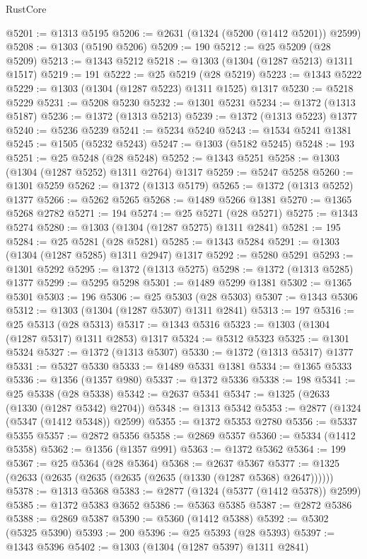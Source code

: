 \begin{lexlean}{RustCore}
\begin{coremodule}
@5201 := @1313 @5195
@5206 := @2631 (@1324 (@5200 (@1412 @5201)) @2599)
@5208 := @1303 (@5190 @5206)
@5209 := 190
@5212 := @25 @5209 (@28 @5209)
@5213 := @1343 @5212
@5218 := @1303 (@1304 (@1287 @5213) @1311 @1517)
@5219 := 191
@5222 := @25 @5219 (@28 @5219)
@5223 := @1343 @5222
@5229 := @1303 (@1304 (@1287 @5223) @1311 @1525) @1317
@5230 := @5218 @5229
@5231 := @5208 @5230
@5232 := @1301 @5231
@5234 := @1372 (@1313 @5187)
@5236 := @1372 (@1313 @5213)
@5239 := @1372 (@1313 @5223) @1377
@5240 := @5236 @5239
@5241 := @5234 @5240
@5243 := @1534 @5241 @1381
@5245 := @1505 (@5232 @5243)
@5247 := @1303 (@5182 @5245)
@5248 := 193
@5251 := @25 @5248 (@28 @5248)
@5252 := @1343 @5251
@5258 := @1303 (@1304 (@1287 @5252) @1311 @2764) @1317
@5259 := @5247 @5258
@5260 := @1301 @5259
@5262 := @1372 (@1313 @5179)
@5265 := @1372 (@1313 @5252) @1377
@5266 := @5262 @5265
@5268 := @1489 @5266 @1381
@5270 := @1365 @5268 @2782
@5271 := 194
@5274 := @25 @5271 (@28 @5271)
@5275 := @1343 @5274
@5280 := @1303 (@1304 (@1287 @5275) @1311 @2841)
@5281 := 195
@5284 := @25 @5281 (@28 @5281)
@5285 := @1343 @5284
@5291 := @1303 (@1304 (@1287 @5285) @1311 @2947) @1317
@5292 := @5280 @5291
@5293 := @1301 @5292
@5295 := @1372 (@1313 @5275)
@5298 := @1372 (@1313 @5285) @1377
@5299 := @5295 @5298
@5301 := @1489 @5299 @1381
@5302 := @1365 @5301
@5303 := 196
@5306 := @25 @5303 (@28 @5303)
@5307 := @1343 @5306
@5312 := @1303 (@1304 (@1287 @5307) @1311 @2841)
@5313 := 197
@5316 := @25 @5313 (@28 @5313)
@5317 := @1343 @5316
@5323 := @1303 (@1304 (@1287 @5317) @1311 @2853) @1317
@5324 := @5312 @5323
@5325 := @1301 @5324
@5327 := @1372 (@1313 @5307)
@5330 := @1372 (@1313 @5317) @1377
@5331 := @5327 @5330
@5333 := @1489 @5331 @1381
@5334 := @1365 @5333
@5336 := @1356 (@1357 @980)
@5337 := @1372 @5336
@5338 := 198
@5341 := @25 @5338 (@28 @5338)
@5342 := @2637 @5341
@5347 := @1325 (@2633 (@1330 (@1287 @5342) @2704))
@5348 := @1313 @5342
@5353 := @2877 (@1324 (@5347 (@1412 @5348)) @2599)
@5355 := @1372 @5353 @2780
@5356 := @5337 @5355
@5357 := @2872 @5356
@5358 := @2869 @5357
@5360 := @5334 (@1412 @5358)
@5362 := @1356 (@1357 @991)
@5363 := @1372 @5362
@5364 := 199
@5367 := @25 @5364 (@28 @5364)
@5368 := @2637 @5367
@5377 := @1325 (@2633 (@2635 (@2635 (@2635 (@2635 (@1330 (@1287 @5368) @2647))))))
@5378 := @1313 @5368
@5383 := @2877 (@1324 (@5377 (@1412 @5378)) @2599)
@5385 := @1372 @5383 @3652
@5386 := @5363 @5385
@5387 := @2872 @5386
@5388 := @2869 @5387
@5390 := @5360 (@1412 @5388)
@5392 := @5302 (@5325 @5390)
@5393 := 200
@5396 := @25 @5393 (@28 @5393)
@5397 := @1343 @5396
@5402 := @1303 (@1304 (@1287 @5397) @1311 @2841)

\end{coremodule}
\end{lexlean}
